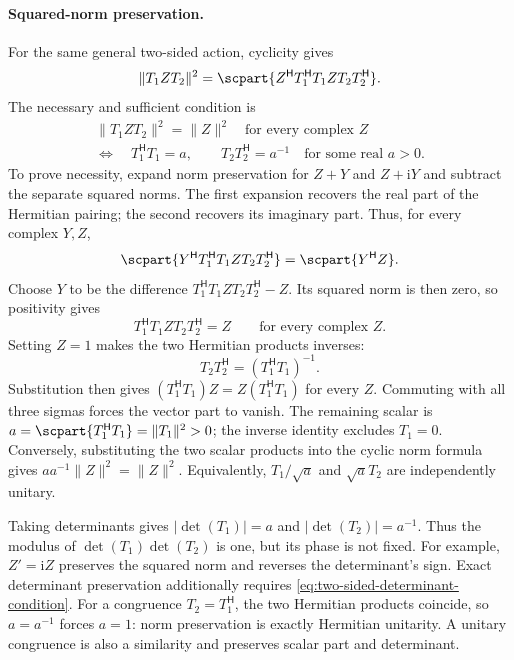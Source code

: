 \documentclass[11pt]{article}
\newcommand{\pv}[1]{{#1}}
\newcommand{\pT}{\pv{T}}
\newcommand{\pY}{\pv{Y}}
\newcommand{\pZ}{\pv{Z}}
\numberwithin{equation}{section}
\newcommand{\ii}{\mathrm{i}}
\begin{document}
\paragraph{Squared-norm preservation.}
For the same general two-sided action, cyclicity gives
\[
 \lVert\pT_1\pZ\pT_2\rVert^2
 =\scpart{\pZ^{\mathsf H}\pT_1^{\mathsf H}\pT_1
                    \pZ\pT_2\pT_2^{\mathsf H}}.
\]
The necessary and sufficient condition is
\begin{equation}
 \boxed{\begin{gathered}
 \lVert\pT_1\pZ\pT_2\rVert^2=\lVert\pZ\rVert^2
       \quad\text{for every complex }\pZ\\
 \Longleftrightarrow\quad
 \pT_1^{\mathsf H}\pT_1=a,\qquad
 \pT_2\pT_2^{\mathsf H}=a^{-1}
       \quad\text{for some real }a>0 .
 \end{gathered}}
 \label{eq:two-sided-norm-condition}
\end{equation}
To prove necessity, expand norm preservation for $\pZ+\pY$ and
$\pZ+\ii\pY$ and subtract the separate squared norms. The first
expansion recovers the real part of the Hermitian pairing; the second
recovers its imaginary part. Thus, for every complex $\pY,\pZ$,
\[
 \scpart{\pY^{\mathsf H}\pT_1^{\mathsf H}\pT_1
                \pZ\pT_2\pT_2^{\mathsf H}}
 =\scpart{\pY^{\mathsf H}\pZ}.
\]
Choose $\pY$ to be the difference
$\pT_1^{\mathsf H}\pT_1\pZ\pT_2\pT_2^{\mathsf H}-\pZ$.
Its squared norm is then zero, so positivity gives
\[
 \pT_1^{\mathsf H}\pT_1\pZ\pT_2\pT_2^{\mathsf H}=\pZ
 \qquad\text{for every complex }\pZ.
\]
Setting $\pZ=1$ makes the two Hermitian products inverses:
\[
 \pT_2\pT_2^{\mathsf H}=(\pT_1^{\mathsf H}\pT_1)^{-1}.
\]
Substitution then gives
$(\pT_1^{\mathsf H}\pT_1)\pZ=\pZ(\pT_1^{\mathsf H}\pT_1)$
for every $\pZ$. Commuting with all three sigmas forces the vector
part to vanish. The remaining scalar is
$a=\scpart{\pT_1^{\mathsf H}\pT_1}=\lVert\pT_1\rVert^2>0$;
the inverse identity excludes $\pT_1=0$.
Conversely, substituting the two scalar products into the cyclic
norm formula gives $aa^{-1}\lVert\pZ\rVert^2=\lVert\pZ\rVert^2$.
Equivalently, $\pT_1/\sqrt{a}$ and
$\sqrt{a}\pT_2$ are independently unitary.

Taking determinants gives
$\lvert\det(\pT_1)\rvert=a$ and
$\lvert\det(\pT_2)\rvert=a^{-1}$.
Thus the modulus of $\det(\pT_1)\det(\pT_2)$ is one, but its
phase is not fixed. For example, $\pZ'=\ii\pZ$ preserves the
squared norm and reverses the determinant's sign. Exact determinant
preservation additionally requires \eqref{eq:two-sided-determinant-condition}.
For a congruence $\pT_2=\pT_1^{\mathsf H}$, the two Hermitian
products coincide, so $a=a^{-1}$ forces $a=1$:
norm preservation is exactly Hermitian unitarity. A unitary
congruence is also a similarity and preserves scalar part and
determinant.
\end{document}
